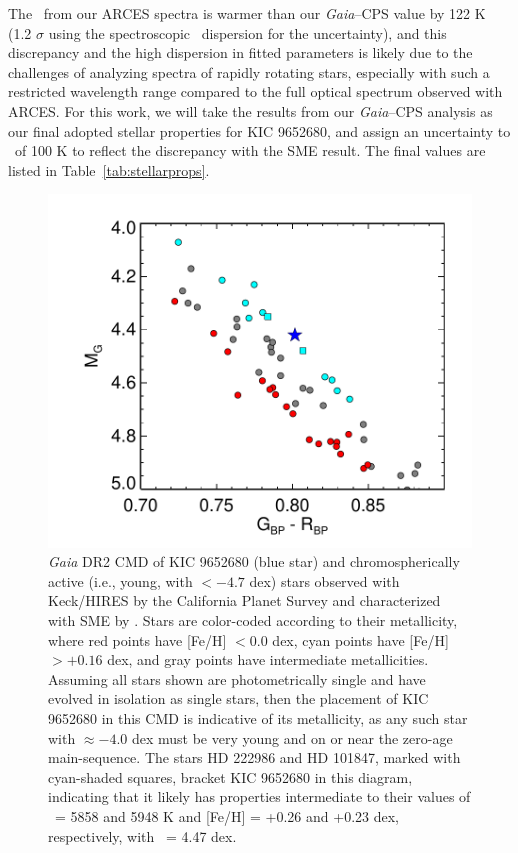 The \teff\ from our ARCES spectra is warmer than our
\textit{Gaia}--CPS value by 122 K 
(1.2 $\sigma$ using the spectroscopic \teff\ dispersion for the uncertainty), 
and this discrepancy and the high dispersion in fitted parameters 
is likely 
due to the challenges 
of analyzing spectra of 
rapidly rotating stars, 
especially with such a restricted wavelength range 
compared to the full optical spectrum observed with 
ARCES.
For this work, 
we will take the results from our 
\textit{Gaia}--CPS analysis as our 
final adopted stellar properties for KIC 9652680, 
and assign an uncertainty to \teff\ of 100 K to 
reflect the discrepancy with the SME result. 
The final values are listed in Table~\ref{tab:stellarprops}.



\begin{figure}
    \centering
    \includegraphics[scale=0.55]{nephelion/KIC-GCPS-v2.pdf}
    \caption{\textit{Gaia} DR2 CMD of KIC 9652680 (blue star) and chromospherically active (i.e., young, with \logrprime $< -4.7$ dex) stars observed with Keck/HIRES by the California Planet Survey and characterized with SME 
    by \citet{Brewer2016}. 
    Stars are color-coded according to their 
    metallicity, where red points have [Fe/H] $< 0.0$ dex, 
    cyan points have [Fe/H] $> +0.16$ dex,
    and gray points have intermediate metallicities.
    Assuming all stars shown are photometrically single 
    and have evolved in isolation as single stars,
    then the placement of KIC 9652680 in this CMD is indicative of its 
    metallicity, as any such star with \logrprime $\approx -4.0$ dex
    must be very young and on or near the zero-age main-sequence.
    The stars HD 222986 and HD 101847, marked with cyan-shaded squares, 
    bracket KIC 9652680 in this diagram, indicating that it likely has 
    properties intermediate to their values of \teff\ = 5858 and 5948 K 
    and [Fe/H] = +0.26 and +0.23 dex, respectively, with \logg\ = 4.47 dex.}
    \label{fig:CMDkic}
\end{figure}

